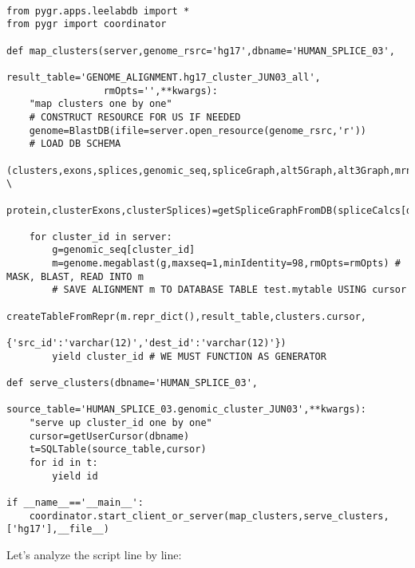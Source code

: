 \documentclass{howto}
\begin{document}
\begin{verbatim}

from pygr.apps.leelabdb import *
from pygr import coordinator

def map_clusters(server,genome_rsrc='hg17',dbname='HUMAN_SPLICE_03',
                 result_table='GENOME_ALIGNMENT.hg17_cluster_JUN03_all',
                 rmOpts='',**kwargs):
    "map clusters one by one"
    # CONSTRUCT RESOURCE FOR US IF NEEDED
    genome=BlastDB(ifile=server.open_resource(genome_rsrc,'r'))
    # LOAD DB SCHEMA
    (clusters,exons,splices,genomic_seq,spliceGraph,alt5Graph,alt3Graph,mrna, \
     protein,clusterExons,clusterSplices)=getSpliceGraphFromDB(spliceCalcs[dbname])

    for cluster_id in server:
        g=genomic_seq[cluster_id]
        m=genome.megablast(g,maxseq=1,minIdentity=98,rmOpts=rmOpts) # MASK, BLAST, READ INTO m
        # SAVE ALIGNMENT m TO DATABASE TABLE test.mytable USING cursor
        createTableFromRepr(m.repr_dict(),result_table,clusters.cursor,
                            {'src_id':'varchar(12)','dest_id':'varchar(12)'})
        yield cluster_id # WE MUST FUNCTION AS GENERATOR

def serve_clusters(dbname='HUMAN_SPLICE_03',
                   source_table='HUMAN_SPLICE_03.genomic_cluster_JUN03',**kwargs):
    "serve up cluster_id one by one"
    cursor=getUserCursor(dbname)
    t=SQLTable(source_table,cursor)
    for id in t:
        yield id

if __name__=='__main__':
    coordinator.start_client_or_server(map_clusters,serve_clusters,['hg17'],__file__)
\end{verbatim}

Let's analyze the script line by line:
\end{document}
